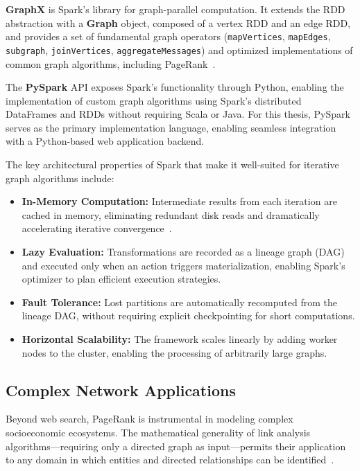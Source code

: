 \textbf{GraphX} is Spark's library for graph-parallel computation. It extends the RDD abstraction with a \textbf{Graph} object, composed of a vertex RDD and an edge RDD, and provides a set of fundamental graph operators (\texttt{mapVertices}, \texttt{mapEdges}, \texttt{subgraph}, \texttt{joinVertices}, \texttt{aggregateMessages}) and optimized implementations of common graph algorithms, including PageRank~\cite{spark_graphx}.

The \textbf{PySpark} API exposes Spark's functionality through Python, enabling the implementation of custom graph algorithms using Spark's distributed DataFrames and RDDs without requiring Scala or Java. For this thesis, PySpark serves as the primary implementation language, enabling seamless integration with a Python-based web application backend.

The key architectural properties of Spark that make it well-suited for iterative graph algorithms include:

\begin{itemize}
    \item \textbf{In-Memory Computation:} Intermediate results from each iteration are cached in memory, eliminating redundant disk reads and dramatically accelerating iterative convergence~\cite{spark_graphx}.
    \item \textbf{Lazy Evaluation:} Transformations are recorded as a lineage graph (DAG) and executed only when an action triggers materialization, enabling Spark's optimizer to plan efficient execution strategies.
    \item \textbf{Fault Tolerance:} Lost partitions are automatically recomputed from the lineage DAG, without requiring explicit checkpointing for short computations.
    \item \textbf{Horizontal Scalability:} The framework scales linearly by adding worker nodes to the cluster, enabling the processing of arbitrarily large graphs.
\end{itemize}


\subsection{Complex Network Applications}
\label{subsec:complex_networks}

Beyond web search, PageRank is instrumental in modeling complex socioeconomic ecosystems. The mathematical generality of link analysis algorithms---requiring only a directed graph as input---permits their application to any domain in which entities and directed relationships can be identified~\cite{liu2014football, ieice2016football, employee_arxiv}.

